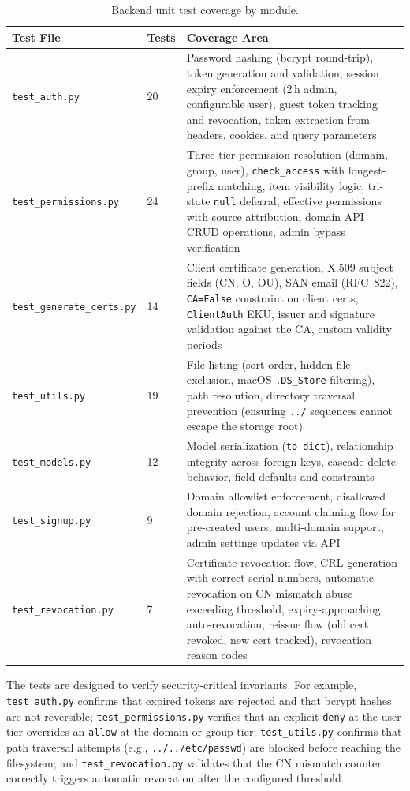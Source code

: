 \documentclass[12pt,letterpaper]{report}
\begin{document}
\begin{table}[ht]
\centering
\caption{Backend unit test coverage by module.}
\label{tab:test-coverage}
\small
\begin{tabular}{llp{}}
\hline
\textbf{Test File} & \textbf{Tests} & \textbf{Coverage Area} \\
\hline
\texttt{test\_auth.py} & 20 & Password hashing (bcrypt round-trip), token generation and validation, session expiry enforcement (2\,h admin, configurable user), guest token tracking and revocation, token extraction from headers, cookies, and query parameters \\
\hline
\texttt{test\_permissions.py} & 24 & Three-tier permission resolution (domain, group, user), \texttt{check\_access} with longest-prefix matching, item visibility logic, tri-state \texttt{null} deferral, effective permissions with source attribution, domain API CRUD operations, admin bypass verification \\
\hline
\texttt{test\_generate\_certs.py} & 14 & Client certificate generation, X.509 subject fields (CN, O, OU), SAN email (RFC~822), \texttt{CA=False} constraint on client certs, \texttt{ClientAuth} EKU, issuer and signature validation against the CA, custom validity periods \\
\hline
\texttt{test\_utils.py} & 19 & File listing (sort order, hidden file exclusion, macOS \texttt{.DS\_Store} filtering), path resolution, directory traversal prevention (ensuring \texttt{../} sequences cannot escape the storage root) \\
\hline
\texttt{test\_models.py} & 12 & Model serialization (\texttt{to\_dict}), relationship integrity across foreign keys, cascade delete behavior, field defaults and constraints \\
\hline
\texttt{test\_signup.py} & 9 & Domain allowlist enforcement, disallowed domain rejection, account claiming flow for pre-created users, multi-domain support, admin settings updates via API \\
\hline
\texttt{test\_revocation.py} & 7 & Certificate revocation flow, CRL generation with correct serial numbers, automatic revocation on CN mismatch abuse exceeding threshold, expiry-approaching auto-revocation, reissue flow (old cert revoked, new cert tracked), revocation reason codes \\
\hline
\end{tabular}
\end{table}

The tests are designed to verify security-critical invariants. For example, \texttt{test\_auth.py} confirms that expired tokens are rejected and that bcrypt hashes are not reversible; \texttt{test\_permissions.py} verifies that an explicit \texttt{deny} at the user tier overrides an \texttt{allow} at the domain or group tier; \texttt{test\_utils.py} confirms that path traversal attempts (e.g., \texttt{../../etc/passwd}) are blocked before reaching the filesystem; and \texttt{test\_revocation.py} validates that the CN mismatch counter correctly triggers automatic revocation after the configured threshold.
\end{document}
